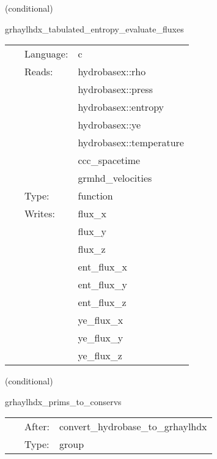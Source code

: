 \documentclass{article}
\begin{document}
\vspace{5mm}

   (conditional) 

\hspace{5mm} grhaylhdx\_tabulated\_entropy\_evaluate\_fluxes 

\hspace{5mm}{\it entropy+tabulated version of grhaylhdx\_evaluate\_fluxes } 


\hspace{5mm}

 \begin{tabular*}{160mm}{cll} 
~ & Language:  & c \\ 
~ & Reads:  & hydrobasex::rho \\ 
~& ~ &hydrobasex::press\\ 
~& ~ &hydrobasex::entropy\\ 
~& ~ &hydrobasex::ye\\ 
~& ~ &hydrobasex::temperature\\ 
~& ~ &ccc\_spacetime\\ 
~& ~ &grmhd\_velocities\\ 
~ & Type:  & function \\ 
~ & Writes:  & flux\_x \\ 
~& ~ &flux\_y\\ 
~& ~ &flux\_z\\ 
~& ~ &ent\_flux\_x\\ 
~& ~ &ent\_flux\_y\\ 
~& ~ &ent\_flux\_z\\ 
~& ~ &ye\_flux\_x\\ 
~& ~ &ye\_flux\_y\\ 
~& ~ &ye\_flux\_z\\ 
\end{tabular*} 


\vspace{5mm}

   (conditional) 

\hspace{5mm} grhaylhdx\_prims\_to\_conservs 

\hspace{5mm}{\it enforce simulation limits on primitives and compute conservatives } 


\hspace{5mm}

 \begin{tabular*}{160mm}{cll} 
~ & After:  & convert\_hydrobase\_to\_grhaylhdx \\ 
~ & Type:  & group \\ 
\end{tabular*} 
\end{document}
